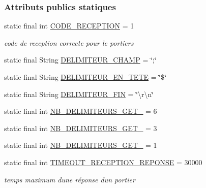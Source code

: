 \subsubsection*{Attributs publics statiques}
\begin{DoxyCompactItemize}
\item 
static final int \hyperlink{classcom_1_1lasalle_1_1meeting_1_1_communication_a9cd85019614f2434af944c955519dfd1}{C\+O\+D\+E\+\_\+\+R\+E\+C\+E\+P\+T\+I\+ON} = 1
\begin{DoxyCompactList}\small\item\em code de reception correcte pour le portiers \end{DoxyCompactList}\item 
static final String \hyperlink{classcom_1_1lasalle_1_1meeting_1_1_communication_aeff38852b1f770d9a13cd5bf02090bb1}{D\+E\+L\+I\+M\+I\+T\+E\+U\+R\+\_\+\+C\+H\+A\+MP} = \char`\"{};\char`\"{}
\item 
static final String \hyperlink{classcom_1_1lasalle_1_1meeting_1_1_communication_a6560c39bb7ebc968e007e4dd98ec296c}{D\+E\+L\+I\+M\+I\+T\+E\+U\+R\+\_\+\+E\+N\+\_\+\+T\+E\+TE} = \char`\"{}\$\char`\"{}
\item 
static final String \hyperlink{classcom_1_1lasalle_1_1meeting_1_1_communication_a6f2e7cb2145496069cdf1b33d017be58}{D\+E\+L\+I\+M\+I\+T\+E\+U\+R\+\_\+\+F\+IN} = \char`\"{}\textbackslash{}r\textbackslash{}n\char`\"{}
\item 
static final int \hyperlink{classcom_1_1lasalle_1_1meeting_1_1_communication_a28886dc20c115ada2e1e3ee745805643}{N\+B\+\_\+\+D\+E\+L\+I\+M\+I\+T\+E\+U\+R\+S\+\_\+\+G\+E\+T\+\_} = 6
\item 
static final int \hyperlink{classcom_1_1lasalle_1_1meeting_1_1_communication_a872d0590c8f9a71ed87484474a0c1070}{N\+B\+\_\+\+D\+E\+L\+I\+M\+I\+T\+E\+U\+R\+S\+\_\+\+G\+E\+T\+\_} = 3
\item 
static final int \hyperlink{classcom_1_1lasalle_1_1meeting_1_1_communication_aa5881937f7ed66ade03b1eb16386ca9b}{N\+B\+\_\+\+D\+E\+L\+I\+M\+I\+T\+E\+U\+R\+S\+\_\+\+G\+E\+T\+\_} = 1
\item 
static final int \hyperlink{classcom_1_1lasalle_1_1meeting_1_1_communication_a7cbfa2bdd8c4978f96abd43740050fe0}{T\+I\+M\+E\+O\+U\+T\+\_\+\+R\+E\+C\+E\+P\+T\+I\+O\+N\+\_\+\+R\+E\+P\+O\+N\+SE} = 30000
\begin{DoxyCompactList}\small\item\em temps maximum d\textquotesingle{}une réponse d\textquotesingle{}un portier \end{DoxyCompactList}\end{DoxyCompactItemize}

